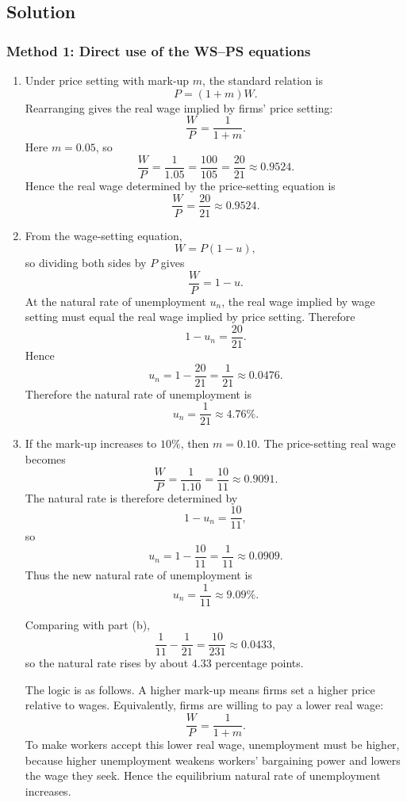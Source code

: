 \documentclass[12pt]{article}
\begin{document}
\subsection{Solution}

\subsubsection{Method 1: Direct use of the WS--PS equations}
\begin{enumerate}[label=(\alph*)]
    \item
    Under price setting with mark-up \(m\), the standard relation is
    \[
    P=(1+m)W.
    \]
    Rearranging gives the real wage implied by firms' price setting:
    \[
    \frac{W}{P}=\frac{1}{1+m}.
    \]
    Here \(m=0.05\), so
    \[
    \frac{W}{P}=\frac{1}{1.05}=\frac{100}{105}=\frac{20}{21}\approx 0.9524.
    \]
    Hence the real wage determined by the price-setting equation is
    \[
    \boxed{\frac{W}{P}=\frac{20}{21}\approx 0.9524.}
    \]

    \item
    From the wage-setting equation,
    \[
    W=P(1-u),
    \]
    so dividing both sides by \(P\) gives
    \[
    \frac{W}{P}=1-u.
    \]
    At the natural rate of unemployment \(u_n\), the real wage implied by wage setting must equal the real wage implied by price setting. Therefore
    \[
    1-u_n=\frac{20}{21}.
    \]
    Hence
    \[
    u_n=1-\frac{20}{21}=\frac{1}{21}\approx 0.0476.
    \]
    Therefore the natural rate of unemployment is
    \[
    \boxed{u_n=\frac{1}{21}\approx 4.76\%.}
    \]

    \item
    If the mark-up increases to \(10\%\), then \(m=0.10\). The price-setting real wage becomes
    \[
    \frac{W}{P}=\frac{1}{1.10}=\frac{10}{11}\approx 0.9091.
    \]
    The natural rate is therefore determined by
    \[
    1-u_n=\frac{10}{11},
    \]
    so
    \[
    u_n=1-\frac{10}{11}=\frac{1}{11}\approx 0.0909.
    \]
    Thus the new natural rate of unemployment is
    \[
    \boxed{u_n=\frac{1}{11}\approx 9.09\%.}
    \]

    Comparing with part (b),
    \[
    \frac{1}{11}-\frac{1}{21}=\frac{10}{231}\approx 0.0433,
    \]
    so the natural rate rises by about \(4.33\) percentage points.

    The logic is as follows. A higher mark-up means firms set a higher price relative to wages. Equivalently, firms are willing to pay a lower real wage:
    \[
    \frac{W}{P}=\frac{1}{1+m}.
    \]
    To make workers accept this lower real wage, unemployment must be higher, because higher unemployment weakens workers' bargaining power and lowers the wage they seek. Hence the equilibrium natural rate of unemployment increases.
\end{enumerate}
\end{document}
